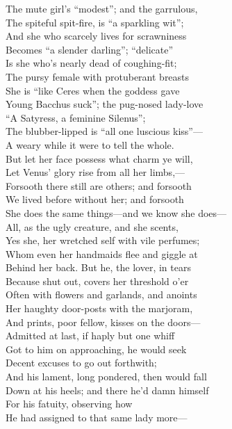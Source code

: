 The mute girl's ``modest''; and the garrulous,\\
The spiteful spit-fire, is ``a sparkling wit'';\\
And she who scarcely lives for scrawniness\\
Becomes ``a slender darling''; ``delicate''\\
Is she who's nearly dead of coughing-fit;\\
The pursy female with protuberant breasts\\
She is ``like Ceres when the goddess gave\\
Young Bacchus suck''; the pug-nosed lady-love\\
``A Satyress, a feminine Silenus'';\\
The blubber-lipped is ``all one luscious kiss''—\\
A weary while it were to tell the whole.\\
But let her face possess what charm ye will,\\
Let Venus' glory rise from all her limbs,—\\
Forsooth there still are others; and forsooth\\
We lived before without her; and forsooth\\
She does the same things—and we know she does—\\
All, as the ugly creature, and she scents,\\
Yes she, her wretched self with vile perfumes;\\
Whom even her handmaids flee and giggle at\\
Behind her back. But he, the lover, in tears\\
Because shut out, covers her threshold o'er\\
Often with flowers and garlands, and anoints\\
Her haughty door-posts with the marjoram,\\
And prints, poor fellow, kisses on the doors—\\
Admitted at last, if haply but one whiff\\
Got to him on approaching, he would seek\\
Decent excuses to go out forthwith;\\
And his lament, long pondered, then would fall\\
Down at his heels; and there he'd damn himself\\
For his fatuity, observing how\\
He had assigned to that same lady more—\\
